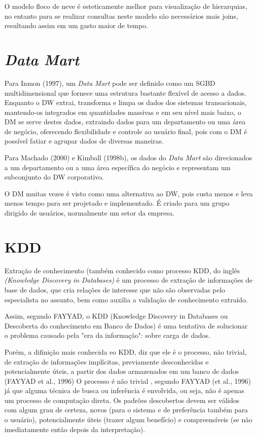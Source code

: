 O modelo floco de neve é esteticamente melhor para visualização de hierarquias, no entanto para se realizar consultas neste modelo são necessários mais joins, resultando assim em um gasto maior de tempo.
	
\section{\textit{Data Mart}}

Para Inmon (1997), um \textit{Data Mart} pode ser definido como um SGBD multidimensional que fornece uma estrutura bastante flexível de acesso a dados. Enquanto o DW extrai, transforma e limpa os dados dos sistemas transacionais, mantendo-os integrados em quantidades massivas e em seu nível mais baixo, o DM se serve destes dados, extraindo dados para um departamento ou uma área de negócio, oferecendo flexibilidade e controle ao usuário final, pois com o DM é possível fatiar e agrupar dados de diversas maneiras.

Para Machado (2000) e Kimball (1998b), os dados do \textit{Data Mart} são direcionados a um departamento ou a uma área específica do negócio e representam um subconjunto do DW corporativo.

O DM muitas vezes é visto como uma alternativa ao DW, pois custa menos e leva menos tempo para ser projetado e implementado. É criado para um grupo dirigido de usuários, normalmente um setor da empresa.

\section{KDD}

Extra\c{c}\~{a}o de conhecimento (tamb\'{e}m conhecido como processo KDD, do inglês 
\textit{(Knowledge Discovery in Databases)} \'{e} um processo de extra\c{c}\~{a}o de informa\c{c}ões de base de dados, que cria rela\c{c}ões de interesse que n\~{a}o s\~{a}o observadas pelo especialista no assunto, bem como auxilia a valida\c{c}\~{a}o de conhecimento extraído.

Assim, segundo FAYYAD, o KDD (Knowledge Discovery in Databases ou Descoberta do conhecimento em Banco de Dados) \'{e} uma tentativa de solucionar o problema causado pela "era da informa\c{c}\~{a}o": sobre carga de dados.

Por\'{e}m, a difini\c{c}\~{a}o mais conhecida eo KDD, diz que ele é o processo, não trivial, de extração de informações implícitas, previamente desconhecidas e potencialmente úteis, a partir dos dados armazenados em um banco de dados (FAYYAD et al., 1996)
O processo \'{e} n\~{a}o trivial , segundo FAYYAD (et al., 1996) j\'{a} que alguma t\'{e}cnica de busca ou inferência \'{e} envolvida, ou seja, n\~{a}o \'{e} apenas um processo de computa\c{c}\~{a}o direta. Os padrões descobertos devem ser v\'{a}lidos com algum grau de certeza, novos (para o sistema e de preferência tamb\'{e}m para o usu\'{a}rio), potencialmente úteis (trazer algum benefício) e compreensíveis (se n\~{a}o imediatamente ent\~{a}o depois da interpreta\c{c}\~{a}o).

